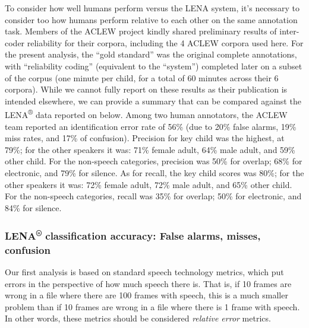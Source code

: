 \documentclass[english,table,man,floatsintext]{apa6}
\begin{document}
To consider how well humans perform versus the LENA system, it's necessary to consider too how humans perform relative to each other on the same annotation task. Members of the ACLEW project kindly shared preliminary results of inter-coder reliability for their corpora, including the 4 ACLEW corpora used here. For the present analysis, the \enquote{gold standard} was the original complete annotations, with \enquote{reliability coding} (equivalent to the \enquote{system}) completed later on a subset of the corpus (one minute per child, for a total of 60 minutes across their 6 corpora). While we cannot fully report on these results as their publication is intended elsewhere, we can provide a summary that can be compared against the LENA\textsuperscript{®} data reported on below. Among two human annotators, the ACLEW team reported an identification error rate of 56\% (due to 20\% false alarms, 19\% miss rates, and 17\% of confusion). Precision for key child was the highest, at 79\%; for the other speakers it was: 71\% female adult, 64\% male adult, and 59\% other child. For the non-speech categories, precision was 50\% for overlap; 68\% for electronic, and 79\% for silence. As for recall, the key child scores was 80\%; for the other speakers it was: 72\% female adult, 72\% male adult, and 65\% other child. For the non-speech categories, recall was 35\% for overlap; 50\% for electronic, and 84\% for silence.

\hypertarget{lena-classification-accuracy-false-alarms-misses-confusion}{%
\subsubsection{\texorpdfstring{LENA\textsuperscript{®} classification accuracy: False alarms, misses, confusion}{LENA® classification accuracy: False alarms, misses, confusion}}\label{lena-classification-accuracy-false-alarms-misses-confusion}}

Our first analysis is based on standard speech technology metrics, which put errors in the perspective of how much speech there is. That is, if 10 frames are wrong in a file where there are 100 frames with speech, this is a much smaller problem than if 10 frames are wrong in a file where there is 1 frame with speech. In other words, these metrics should be considered \emph{relative error} metrics.
\end{document}
